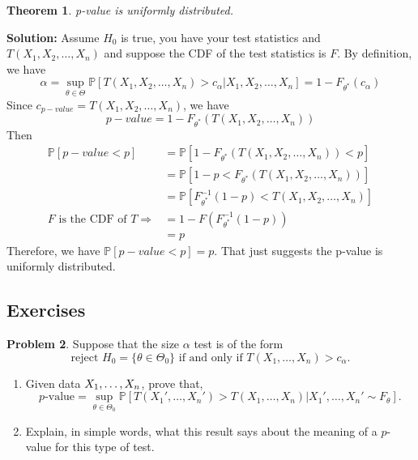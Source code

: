 \documentclass[13pt]{article}
\newtheorem{theorem}{Theorem}[section]
\theoremstyle{definition}
\newtheorem{problem}[theorem]{Problem}
\newenvironment{solution}
{\color{C2}\begin{framed}\begingroup\textbf{Solution:} }
  {\endgroup\end{framed}}
\theoremstyle{remark}
\newcommand{\PP}{\mathbb{P}}
\begin{document}
\begin{theorem}
    p-value is uniformly distributed.
\end{theorem}

\begin{solution}
    Assume $H_0$ is true, you have your test statistics and $T(X_1, X_2, \ldots, X_n)$ and suppose the CDF of the test statistics is $F$. By definition, we have
    \[
    \alpha = \sup_{\theta\in\Theta}\PP[T(X_1, X_2, \ldots, X_n)>c_{\alpha}|X_1, X_2, \ldots, X_n] = 1- F_{\theta^*}(c_{\alpha})
    \]
    Since $c_{p-value} = T(X_1, X_2, \ldots, X_n)$, we have
    \[
    p-value = 1- F_{\theta^*}(T(X_1, X_2, \ldots, X_n))
    \]
    Then 
    \begin{align*}
        \PP[p-value<p] &= \PP[1- F_{\theta^*}(T(X_1, X_2, \ldots, X_n))<p]\\
        &= \PP[1-p< F_{\theta^*}(T(X_1, X_2, \ldots, X_n))]\\
        &=\PP[F_{\theta^*}^{-1}(1-p)< T(X_1, X_2, \ldots, X_n)]\\
        \text{$F$ is the CDF of $T$}\Longrightarrow&=1-F(F_{\theta^*}^{-1}(1-p))\\
        &=p
    \end{align*}
    Therefore, we have $\PP[p-value<p]=p$. That just suggests the p-value is uniformly distributed.
\end{solution}



\subsection{Exercises}
\begin{problem}
Suppose that the size $\alpha$ test is of the form
    \begin{equation*}
        \text{reject $H_0=\{\theta\in\Theta_0\}$ if and only if $T(X_1, \ldots, X_n) > c_\alpha$}.
    \end{equation*}

    \begin{enumerate}[label=(\alph*),topsep=0pt]
        \item Given data $X_1, \ldots, X_n\mkern1mu$, prove that, 
    \begin{equation*}
        \text{$p$-value} = \sup_{\theta\in\Theta_0} \PP[T(X_1', \ldots, X_n') > T(X_1, \ldots, X_n) | X_1', \ldots, X_n' \sim F_\theta].
    \end{equation*}
    \item Explain, in simple words, what this result says about the meaning of a $p$-value for this type of test.
    \end{enumerate}
\end{problem}
\end{document}
